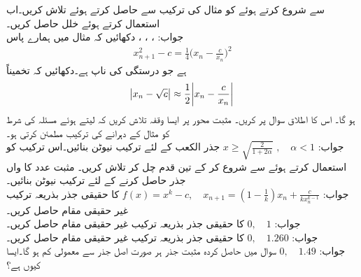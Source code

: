 \quad
{} سے شروع کرتے ہوئے  کو مثال  کی ترکیب سے حاصل کرتے ہوئے  تلاش کریں۔اب  استعمال کرتے ہوئے خلل حاصل کریں۔\\
جواب:\quad
{}، ، ،
\quad
دکھائیں کہ مثال  میں ہمارے پاس
\begin{align*}
x^2_{n+1}-c=\frac{1}{4}\big(x_n-\frac{c}{x_n}\big)^2
\end{align*}
ہے جو درستگی کی ناپ ہے۔دکھائیں کہ تخمیناً
\begin{align*}
\abs{x_n-\sqrt{c}}\approx \frac{1}{2}\abs{x_n-\frac{c}{x_n}}
\end{align*}
ہو گا۔ اس کا اطلاق سوال  پر کریں۔
\quad
مثبت  محور پر ایسا وقفہ تلاش کریں کہ  لیتے ہوئے مسئلہ  کی شرط کو  مثال  کے دہرانے کی ترکیب مطمئن کرتی ہو۔ \\
جواب:\quad
$x\ge \sqrt{\tfrac{2}{1+2\alpha}}\,\,,\quad \alpha<1$
\quad
جذر الکعب کے لئے ترکیب نیوٹن بنائیں۔اس ترکیب کو استعمال کرتے ہوئے  سے شروع کر کے تین قدم چل کر   تلاش کریں۔
\quad
مثبت عدد  کا  واں جذر حاصل کرنے کے لئے ترکیب نیوٹن بنائیں۔\\
جواب:\quad
$f(x)=x^k-c,\quad x_{n+1}=(1-\tfrac{1}{k})x_n+\tfrac{c}{kx_n^{k-1}}$
\quad
{} کا حقیقی جذر بذریعہ ترکیب غیر حقیقی مقام حاصل کریں۔ \\
جواب:\quad
$0,\quad 1$
\quad
{} کا حقیقی جذر بذریعہ ترکیب غیر حقیقی مقام حاصل کریں۔ \\
جواب:\quad
$0,\quad 1.260$
\quad
{} کا حقیقی جذر بذریعہ ترکیب غیر حقیقی مقام حاصل کریں۔ \\
جواب:\quad
$0,\quad 1.49$
\quad
سوال  میں حاصل کردہ مثبت جذر ہر صورت اصل جذر سے معمولی کم ہو گا۔ایسا کیوں ہے؟
